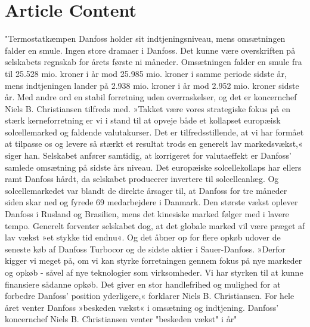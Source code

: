 \chapter{Article Content}

"Termostatkæmpen Danfoss holder sit indtjeningsniveau, mens omsætningen falder en smule.
	Ingen store dramaer i Danfoss.
	Det kunne være overskriften på selskabets regnskab for årets første ni måneder. Omsætningen falder en smule fra til 25.528 mio. kroner i år mod 25.985 mio. kroner i samme periode sidste år, mens indtjeningen lander på 2.938 mio. kroner i år mod 2.952 mio. kroner sidste år.
	Med andre ord en stabil forretning uden overraskelser, og det er koncernchef Niels B. Christiansen tilfreds med.
	»Takket være vores strategiske fokus på en stærk kerneforretning er vi i stand til at opveje både et kollapset europæisk solcellemarked og faldende valutakurser. Det er tilfredsstillende, at vi har formået at tilpasse os og levere så stærkt et resultat trods en generelt lav markedsvækst,« siger han.
	Selskabet anfører samtidig, at korrigeret for valutaeffekt er Danfoss' samlede omsætning på sidste års niveau.
	Det europæiske solcellekollaps har ellers ramt Danfoss hårdt, da selskabet producerer invertere til solcelleanlæg. Og solcellemarkedet var blandt de direkte årsager til, at Danfoss for tre måneder siden skar ned og fyrede 69 medarbejdere i Danmark.
	Den største vækst oplever Danfoss i Rusland og Brasilien, mens det kinesiske marked følger med i lavere tempo. Generelt forventer selskabet dog, at det globale marked vil være præget af lav vækst »et stykke tid endnu«. Og det åbner op for flere opkøb udover de seneste køb af Danfoss Turbocor og de sidste aktier i Sauer-Danfoss.
	»Derfor kigger vi meget på, om vi kan styrke forretningen gennem fokus på nye markeder og opkøb - såvel af nye teknologier som virksomheder. Vi har styrken til at kunne finansiere sådanne opkøb. Det giver en stor handlefrihed og mulighed for at forbedre Danfoss' position yderligere,« forklarer Niels B. Christiansen.
	For hele året venter Danfoss »beskeden vækst« i omsætning og indtjening.
	Danfoss' koncernchef Niels B. Christiansen venter "beskeden vækst" i år"